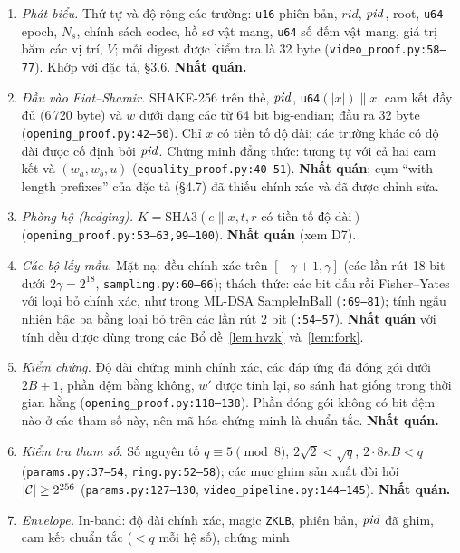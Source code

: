 \begin{enumerate}
\item \emph{Phát biểu.} Thứ tự và độ rộng các trường: \texttt{u16} phiên bản,
  $\mathit{rid}$, $\mathit{pid}$, root, \texttt{u64} epoch, $N_s$, chính sách codec,
  hồ sơ vật mang, \texttt{u64} số đếm vật mang, giá trị băm các vị trí, $V$;
  mỗi digest được kiểm tra là 32 byte (\texttt{video\_proof.py:58--77}).
  Khớp với đặc tả, \S3.6. \textbf{Nhất quán.}
\item \emph{Đầu vào Fiat--Shamir.} SHAKE-256 trên thẻ, $\mathit{pid}$,
  \texttt{u64}$(|x|)\|x$, cam kết đầy đủ (6\,720 byte) và $w$ dưới dạng các
  từ 64 bit big-endian; đầu ra 32 byte
  (\texttt{opening\_proof.py:42--50}). Chỉ $x$ có tiền tố độ dài; các trường
  khác có độ dài được cố định bởi $\mathit{pid}$. Chứng minh đẳng thức: tương tự với
  cả hai cam kết và $(w_a,w_b,u)$ (\texttt{equality\_proof.py:40--51}).
  \textbf{Nhất quán}; cụm ``with length prefixes'' của đặc tả (\S4.7)
  đã thiếu chính xác và đã được chỉnh sửa.
\item \emph{Phòng hộ (hedging).} $K=\mathrm{SHA3}(e\|x,t,r\text{ có tiền tố độ dài})$
  (\texttt{opening\_proof.py:53--63,99--100}). \textbf{Nhất quán} (xem D7).
\item \emph{Các bộ lấy mẫu.} Mặt nạ: đều chính xác trên $[-\gamma+1,\gamma]$
  (các lần rút 18 bit dưới $2\gamma=2^{18}$, \texttt{sampling.py:60--66});
  thách thức: các bit dấu rồi Fisher--Yates với loại bỏ chính xác, như trong
  ML-DSA \textsf{SampleInBall} (\texttt{:69--81}); tính ngẫu nhiên bậc ba bằng
  loại bỏ trên các lần rút 2 bit (\texttt{:54--57}). \textbf{Nhất quán} với
  tính đều được dùng trong các Bổ đề~\ref{lem:hvzk} và~\ref{lem:fork}.
\item \emph{Kiểm chứng.} Độ dài chứng minh chính xác, các đáp ứng đã đóng gói
  dưới $2B+1$, phần đệm bằng không, $w'$ được tính lại, so sánh hạt giống
  trong thời gian hằng (\texttt{opening\_proof.py:118--138}). Phần đóng gói
  không có bit đệm nào ở các tham số này, nên mã hóa chứng minh là chuẩn tắc.
  \textbf{Nhất quán.}
\item \emph{Kiểm tra tham số.} Số nguyên tố $q\equiv5\pmod8$, $2\sqrt2<\sqrt q$,
  $2\cdot8\kappa B<q$ (\texttt{params.py:37--54}, \texttt{ring.py:52--58});
  các mục ghim sản xuất đòi hỏi $|\mathcal{C}|\ge2^{256}$
  (\texttt{params.py:127--130}, \texttt{video\_pipeline.py:144--145}).
  \textbf{Nhất quán.}
\item \emph{Envelope.} In-band: độ dài chính xác, magic \texttt{ZKLB}, phiên
  bản, $\mathit{pid}$ đã ghim, cam kết chuẩn tắc ($<q$ mỗi hệ số), chứng minh

\end{enumerate}
